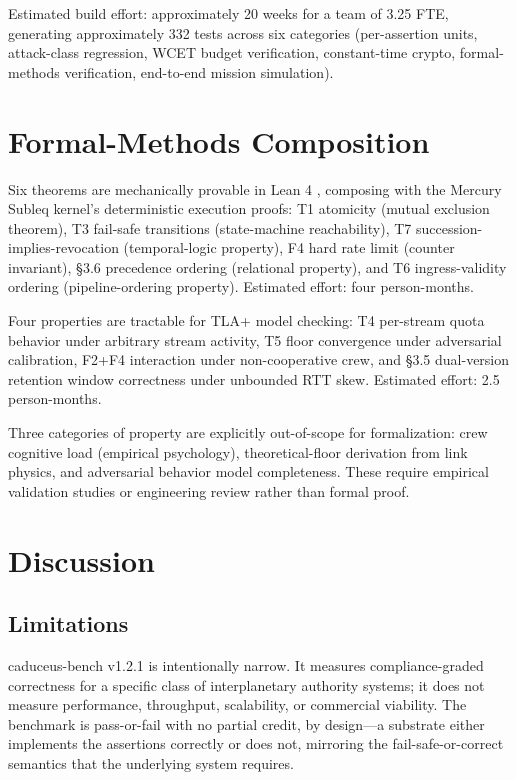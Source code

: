 \documentclass[conference]{IEEEtran}
\begin{document}
Estimated build effort: approximately 20 weeks for a team of 3.25 FTE, generating approximately 332 tests across six categories (per-assertion units, attack-class regression, WCET budget verification, constant-time crypto, formal-methods verification, end-to-end mission simulation).

\section{Formal-Methods Composition}\label{sec:formal}

Six theorems are mechanically provable in Lean 4 \cite{moura2021lean}, composing with the Mercury Subleq kernel's deterministic execution proofs: T1 atomicity (mutual exclusion theorem), T3 fail-safe transitions (state-machine reachability), T7 succession-implies-revocation (temporal-logic property), F4 hard rate limit (counter invariant), \S 3.6 precedence ordering (relational property), and T6 ingress-validity ordering (pipeline-ordering property). Estimated effort: four person-months.

Four properties are tractable for TLA+ \cite{lamport2002tla} model checking: T4 per-stream quota behavior under arbitrary stream activity, T5 floor convergence under adversarial calibration, F2+F4 interaction under non-cooperative crew, and \S 3.5 dual-version retention window correctness under unbounded RTT skew. Estimated effort: 2.5 person-months.

Three categories of property are explicitly out-of-scope for formalization: crew cognitive load (empirical psychology), theoretical-floor derivation from link physics, and adversarial behavior model completeness. These require empirical validation studies or engineering review rather than formal proof.

\section{Discussion}\label{sec:discussion}

\subsection{Limitations}

caduceus-bench v1.2.1 is intentionally narrow. It measures compliance-graded correctness for a specific class of interplanetary authority systems; it does not measure performance, throughput, scalability, or commercial viability. The benchmark is pass-or-fail with no partial credit, by design---a substrate either implements the assertions correctly or does not, mirroring the fail-safe-or-correct semantics that the underlying system requires.
\end{document}
